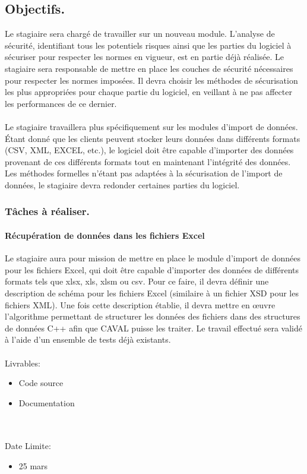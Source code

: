 \documentclass[init,francais]{rapportPFE}  %
\begin{document}
\subsection{Objectifs.}

Le stagiaire sera chargé de travailler sur un nouveau module. L'analyse de sécurité, identifiant tous les potentiels risques ainsi que les parties du logiciel à sécuriser pour respecter les normes en vigueur, est en partie déjà réalisée.
Le stagiaire sera responsable de mettre en place les couches de sécurité nécessaires pour respecter les normes imposées. Il devra choisir les méthodes de sécurisation les plus appropriées pour chaque partie du logiciel, en veillant à ne pas affecter les performances de ce dernier.
\\~\\
Le stagiaire travaillera plus spécifiquement sur les modules d'import de données. Étant donné que les clients peuvent stocker leurs données dans différents formats (CSV, XML, EXCEL, etc.),
le logiciel doit être capable d'importer des données provenant de ces différents formats tout en maintenant l'intégrité des données. 
Les méthodes formelles n'étant pas adaptées à la sécurisation de l'import de données, le stagiaire devra redonder certaines parties du logiciel.

\subsubsection{Tâches à réaliser.}

\paragraph*{Récupération de données dans les fichiers Excel}


Le stagiaire aura pour mission de mettre en place le module d'import de données pour les fichiers Excel, 
qui doit être capable d'importer des données de différents formats tels que xlsx, xls, xlsm ou csv. 
Pour ce faire, il devra définir une description de schéma pour les fichiers Excel (similaire à un fichier XSD pour les fichiers XML). 
Une fois cette description établie, il devra mettre en œuvre l'algorithme permettant de structurer les données des fichiers dans des structures de données C++ 
afin que CAVAL puisse les traiter.
Le travail effectué sera validé à l'aide d'un ensemble de tests déjà existants.\\~\\
Livrables:
\begin{itemize}
  \item Code source
  \item Documentation
\end{itemize}\\~\\
Date Limite:
\begin{itemize}
  \item 25 mars
\end{itemize}
\end{document}
